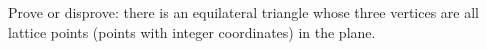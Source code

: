 Prove or disprove: there is an equilateral triangle whose three vertices are all lattice points (points with integer coordinates) in the plane.

